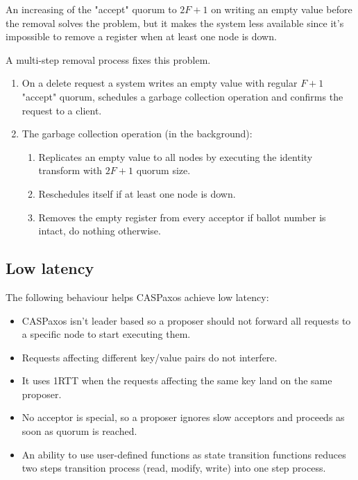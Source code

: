 \documentclass[12pt]{article}
\theoremstyle{definition}
\begin{document}
An increasing of the "accept" quorum to $2F+1$ on writing an empty value before the removal solves the problem, but it makes the system less available since it's impossible to remove a register when at least one node is down.

A multi-step removal process fixes this problem.

\begin{enumerate}
  \item On a delete request a system writes an empty value with regular $F+1$ "accept" quorum, schedules a garbage collection operation and confirms the request to a client.
  \item The garbage collection operation (in the background):
  \begin{enumerate}
    \item Replicates an empty value to all nodes by executing the  identity transform with $2F+1$ quorum size.
    \item Reschedules itself if at least one node is down.
    \item Removes the empty register from every acceptor if ballot number is intact, do nothing otherwise.
  \end{enumerate}
\end{enumerate}

\newpage

\subsection{Low latency}

The following behaviour helps CASPaxos achieve low latency:
\begin{itemize}[noitemsep]
  \item CASPaxos isn't leader based so a proposer should not forward all requests to a specific node to start executing them.
  \item Requests affecting different key/value pairs do not interfere.
  \item It uses 1RTT when the requests affecting the same key land on the same proposer.
  \item No acceptor is special, so a proposer ignores slow acceptors and proceeds as soon as quorum is reached.
  \item An ability to use user-defined functions as state transition functions reduces two steps transition process (read, modify, write) into one step process.
\end{itemize}
\end{document}
